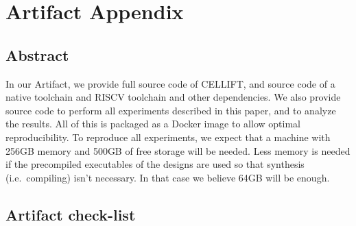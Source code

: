 \documentclass[letterpaper,twocolumn,10pt]{article}
\begin{document}


\newcommand{\ourname}{C{\smaller[1]ELL}IFT\xspace}

\appendix
\section{Artifact Appendix}

%

\subsection{Abstract}

In our Artifact, we provide full source code of \ourname, and source code
of a native toolchain and RISCV toolchain and other dependencies. We also
provide source code to perform all experiments described in this paper,
and to analyze the results. All of this is packaged as a Docker image to
allow optimal reproducibility. To reproduce all experiments, we expect that
a machine with 256GB memory and 500GB of free storage will be needed. Less memory is needed if the
precompiled executables of the designs are used so that synthesis (i.e.\ compiling)
isn't necessary. In that case we believe 64GB will be enough.

\subsection{Artifact check-list}

\end{document}
